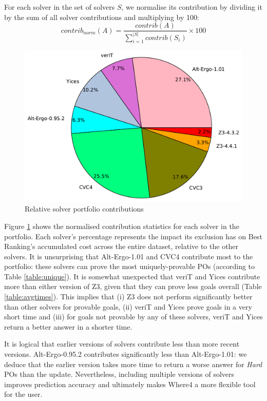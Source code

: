 For each solver in the set of solvers $S$, we normalise its contribution by dividing it by the sum of all solver contributions and multiplying by 100:
\[
	contrib_{norm}(A) = \frac{contrib(A)}{\sum_{i=1}^{|S|} contrib(S_i)} \times 100
\]
\begin{figure}
\centering
\includegraphics[width=0.8\linewidth]{Figures/pie}
\caption[Relative solver portfolio contributions]{Relative solver portfolio contributions}
\label{fig:pie}
\end{figure}
Figure \ref{fig:pie} shows the normalised contribution statistics for each solver in the portfolio.
Each solver's percentage represents the impact its exclusion has on \textsf{Best Ranking}'s accumulated cost across the entire dataset, relative to the other solvers.
It is unsurprising that Alt-Ergo-1.01 and CVC4 contribute most to the portfolio: these solvers can prove the most uniquely-provable POs (according to Table \ref{table:unique}).  
It is somewhat unexpected that veriT and Yices contribute more than either version of Z3, given that they can prove less goals overall (Table \ref{table:avgtimes}).
This implies that (i) Z3 does not perform significantly better than other solvers for provable goals, (ii) veriT and Yices prove goals in a very short time and (iii) for goals not provable by any of these solvers, veriT and Yices return a better answer in a shorter time.

It is logical that earlier versions of solvers contribute less than more recent versions. 
Alt-Ergo-0.95.2 contributes significantly less than Alt-Ergo-1.01: we deduce that the earlier version takes more time to return a worse answer for \textit{Hard} POs than the update.
Nevertheless, including multiple versions of solvers improves prediction accuracy and ultimately makes \textsf{Where4} a more flexible tool for the user.     


